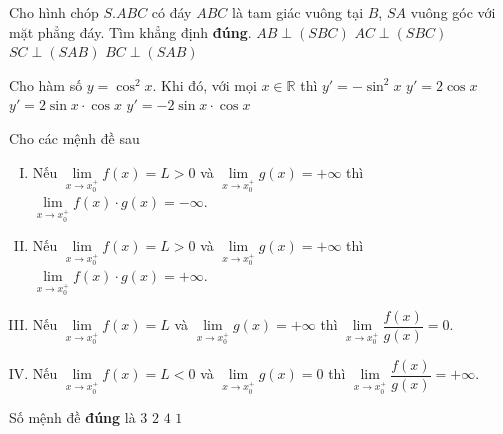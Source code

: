 \begin{ex} %
Cho hình chóp $S.ABC$ có đáy $ABC$ là tam giác vuông tại $B$, $SA$ vuông góc với mặt phẳng 
đáy. Tìm khẳng định \textbf{đúng}.
\choice
{$AB \perp \left(SBC\right)$}
{$AC\perp \left(SBC\right)$}
{$SC \perp \left(SAB\right)$}
{\True $BC\perp \left(SAB\right)$}
\end{ex}
\begin{ex}%
Cho hàm số $y=\cos^2 x$. Khi đó, với mọi $x\in \mathbb{R}$ thì
\choice
{$y'=-\sin^2 x$}
{$y'=2\cos x$}
{$y'=2\sin x \cdot\cos x$}
{\True $y'=-2\sin x \cdot \cos x$}
\end{ex}
\begin{ex}%
Cho các mệnh đề sau
\begin{enumerate}[I)]
	\item Nếu $\underset{x\to x_0^{+}}{\mathop{\lim}}f(x)=L>0$ và $\underset{x\to x_0^{+}}{\mathop{\lim}}g(x)=+\infty $ thì $\underset{x\to x_0^{+}}{\mathop{\lim}}f(x) \cdot g(x)=-\infty $.
	\item Nếu $\underset{x\to x_0^{+}}{\mathop{\lim}}f(x)=L>0$ và $\underset{x\to x_0^{+}}{\mathop{\lim}}g(x)=+\infty $ thì $\underset{x\to x_0^{+}}{\mathop{\lim}}f(x) \cdot g(x)=+\infty $.
	\item Nếu $\underset{x\to x_0^{+}}{\mathop{\lim}}f(x)=L$ và $\underset{x\to x_0^{+}}{\mathop{\lim}}g(x)=+\infty $ thì $\underset{x\to x_0^{+}}{\mathop{\lim}}\dfrac{f(x)}{g(x)}=0$.
	\item Nếu $\underset{x\to x_0^{+}}{\mathop{\lim}}f(x)=L<0$ và $\underset{x\to x_0^{+}}{\mathop{\lim}}g(x)=0$ thì $\underset{x\to x_0^{+}}{\mathop{\lim}}\dfrac{f(x)}{g(x)}=+\infty $.
\end{enumerate}
Số mệnh đề\textbf{ đúng} là
\choice
{$3$}
{\True $2$}
{$4$}
{$1$}
\end{ex}
